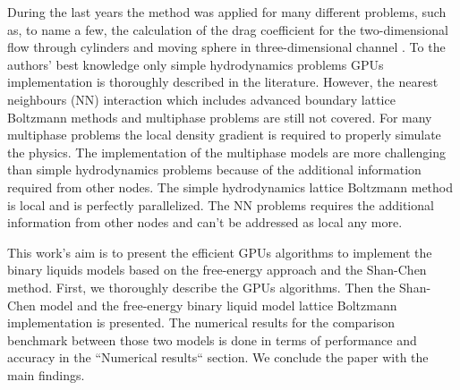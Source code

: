 \documentclass[mathpazo]{cicp}
\begin{document}
During the last years the method was applied for many different problems, such as, to name a few, the calculation of the drag coefficient for the two-dimensional flow through cylinders \cite{tolke-twod} and moving sphere in three-dimensional channel \cite{tolke-GPU}. To the authors' best knowledge only simple hydrodynamics problems GPUs implementation is thoroughly described in the literature. However, the nearest neighbours (NN) interaction which includes advanced boundary lattice Boltzmann methods and multiphase problems are still not covered. For many multiphase problems the local density gradient is required to properly simulate the physics. The implementation of the multiphase models are more challenging than simple hydrodynamics problems because of the additional information required from other nodes. The simple hydrodynamics lattice Boltzmann method is local and is perfectly parallelized. The NN problems requires the additional information from other nodes and can't be addressed as local any more. 

This work's aim is to present the efficient GPUs algorithms to implement the binary liquids models based on the free-energy approach and the Shan-Chen method. First, we thoroughly describe the GPUs algorithms. Then the Shan-Chen model and the free-energy binary liquid model lattice Boltzmann implementation is presented. The numerical results for the comparison benchmark between those two models is done in terms of performance and accuracy in the ``Numerical results`` section. We conclude the paper with the main findings.
\end{document}
